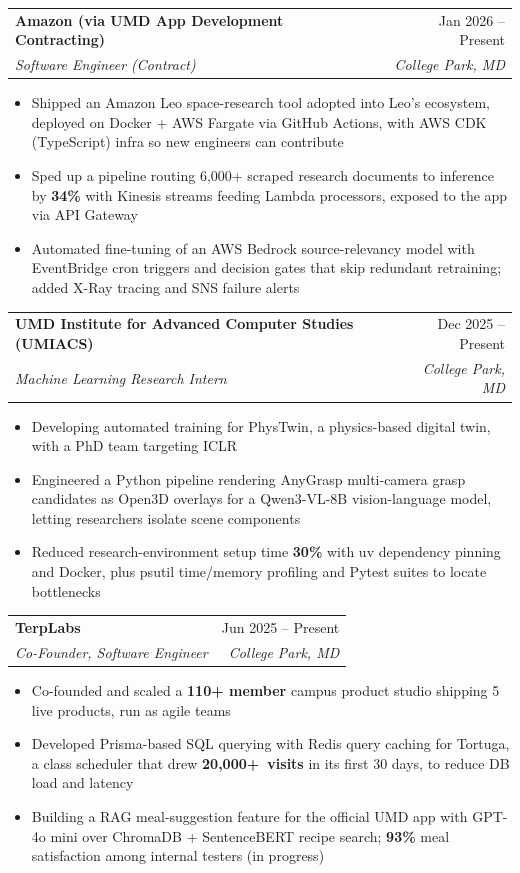 \documentclass[letterpaper,10pt]{article}
\makeatletter
\newcommand{\resumeItem}[1]{\item{#1}\vspace{-1pt}}
\newcommand{\resumeSubheading}[4]{%
  \vspace{-1pt}\item
  \begin{tabular*}{\textwidth}[t]{l@{\extracolsep{\fill}}r}
    \textbf{#1} & #2 \\
    \textit{#3} & \textit{#4} \\
  \end{tabular*}\vspace{-6pt}%
}
\newcommand{\resumeItemListStart}{\begin{itemize}[leftmargin=0.18in, itemsep=0pt, topsep=1pt, parsep=0pt]}
\newcommand{\resumeItemListEnd}{\end{itemize}\vspace{2pt}}
\makeatother
\begin{document}
  \resumeSubheading
    {Amazon (via UMD App Development Contracting)}{Jan 2026 -- Present}
    {Software Engineer (Contract)}{College Park, MD}
  \resumeItemListStart
    \resumeItem{Shipped an Amazon Leo space-research tool adopted into Leo's ecosystem, deployed on Docker + AWS Fargate via GitHub Actions, with AWS CDK (TypeScript) infra so new engineers can contribute}
    \resumeItem{Sped up a pipeline routing 6,000+ scraped research documents to inference by \textbf{34\%} with Kinesis streams feeding Lambda processors, exposed to the app via API Gateway}
    \resumeItem{Automated fine-tuning of an AWS Bedrock source-relevancy model with EventBridge cron triggers and decision gates that skip redundant retraining; added X-Ray tracing and SNS failure alerts}
  \resumeItemListEnd

  \resumeSubheading
    {UMD Institute for Advanced Computer Studies (UMIACS)}{Dec 2025 -- Present}
    {Machine Learning Research Intern}{College Park, MD}
  \resumeItemListStart
    \resumeItem{Developing automated training for PhysTwin, a physics-based digital twin, with a PhD team targeting ICLR}
    \resumeItem{Engineered a Python pipeline rendering AnyGrasp multi-camera grasp candidates as Open3D overlays for a Qwen3-VL-8B vision-language model, letting researchers isolate scene components}
    \resumeItem{Reduced research-environment setup time \textbf{30\%} with uv dependency pinning and Docker, plus psutil time/memory profiling and Pytest suites to locate bottlenecks}
  \resumeItemListEnd

  \resumeSubheading
    {TerpLabs}{Jun 2025 -- Present}
    {Co-Founder, Software Engineer}{College Park, MD}
  \resumeItemListStart
    \resumeItem{Co-founded and scaled a \textbf{110+ member} campus product studio shipping 5 live products, run as agile teams}
    \resumeItem{Developed Prisma-based SQL querying with Redis query caching for Tortuga, a class scheduler that drew \mbox{\textbf{20,000+ visits}} in its first 30 days, to reduce DB load and latency}
    \resumeItem{Building a RAG meal-suggestion feature for the official UMD app with GPT-4o mini over ChromaDB + SentenceBERT recipe search; \textbf{93\%} meal satisfaction among internal testers (in progress)}
  \resumeItemListEnd
\end{document}

